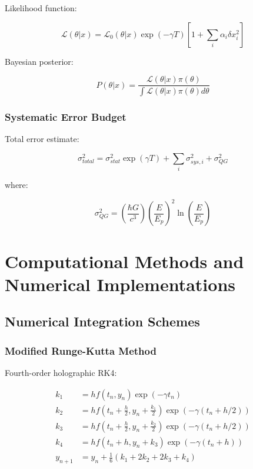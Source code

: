 \documentclass[12pt]{article}
\theoremstyle{plain}
\theoremstyle{definition}
\theoremstyle{remark}
\begin{document}
Likelihood function:

\begin{equation}
\mathcal{L}(\theta|x) = \mathcal{L}_0(\theta|x)\exp(-\gamma T)\left[1 + \sum_i \alpha_i\delta x_i^2\right]
\end{equation}

Bayesian posterior:

\begin{equation}
P(\theta|x) = \frac{\mathcal{L}(\theta|x)\pi(\theta)}{\int \mathcal{L}(\theta|x)\pi(\theta)d\theta}
\end{equation}

\subsubsection{Systematic Error Budget}

Total error estimate:

\begin{equation}
\sigma_{total}^2 = \sigma_{stat}^2\exp(\gamma T) + \sum_i \sigma_{sys,i}^2 + \sigma_{QG}^2
\end{equation}

where:

\begin{equation}
\sigma_{QG}^2 = \left(\frac{\hbar G}{c^3}\right)\left(\frac{E}{E_p}\right)^2\ln\left(\frac{E}{E_p}\right)
\end{equation}
\section{Computational Methods and Numerical Implementations}

\subsection{Numerical Integration Schemes}

\subsubsection{Modified Runge-Kutta Method}

Fourth-order holographic RK4:

\begin{equation}
\begin{aligned}
k_1 &= hf(t_n, y_n)\exp(-\gamma t_n) \\
k_2 &= hf(t_n + \frac{h}{2}, y_n + \frac{k_1}{2})\exp(-\gamma(t_n + h/2)) \\
k_3 &= hf(t_n + \frac{h}{2}, y_n + \frac{k_2}{2})\exp(-\gamma(t_n + h/2)) \\
k_4 &= hf(t_n + h, y_n + k_3)\exp(-\gamma(t_n + h)) \\
y_{n+1} &= y_n + \frac{1}{6}(k_1 + 2k_2 + 2k_3 + k_4)
\end{aligned}
\end{equation}
\end{document}
